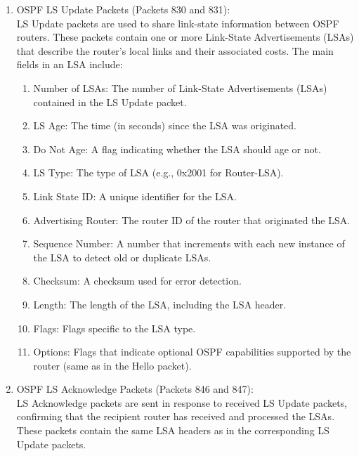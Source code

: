 \begin{enumerate}[label=\arabic*.]
\item OSPF LS Update Packets (Packets 830 and 831):\\
LS Update packets are used to share link-state information between OSPF routers. These packets contain one or more Link-State Advertisements (LSAs) that describe the router's local links and their associated costs. The main fields in an LSA include:
  \begin{enumerate}[label=\arabic*.]
  \item Number of LSAs: The number of Link-State Advertisements (LSAs) contained in the LS Update packet.
  \item LS Age: The time (in seconds) since the LSA was originated.
  \item Do Not Age: A flag indicating whether the LSA should age or not.
  \item LS Type: The type of LSA (e.g., 0x2001 for Router-LSA).
  \item Link State ID: A unique identifier for the LSA.
  \item Advertising Router: The router ID of the router that originated the LSA.
  \item Sequence Number: A number that increments with each new instance of the LSA to detect old or duplicate LSAs.
  \item Checksum: A checksum used for error detection.
  \item Length: The length of the LSA, including the LSA header.
  \item Flags: Flags specific to the LSA type.
  \item Options: Flags that indicate optional OSPF capabilities supported by the router (same as in the Hello packet).
  \end{enumerate}

\item OSPF LS Acknowledge Packets (Packets 846 and 847):\\
LS Acknowledge packets are sent in response to received LS Update packets, confirming that the recipient router has received and processed the LSAs. These packets contain the same LSA headers as in the corresponding LS Update packets.
\end{enumerate}
